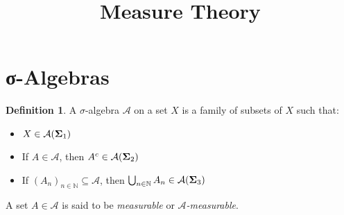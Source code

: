 \documentclass[12pt]{article}
\title{\textbf{Measure Theory}\\[0.5em]}
\author{}
\date{}
\theoremstyle{definition}
\newtheorem{definition}{Definition}[section]
\begin{document}
\maketitle

\section{σ-Algebras}

\medskip
\begin{definition}
A $\sigma$-algebra $\mathcal{A}$ on a set $X$ is a family of subsets of $X$ such that:
\begin{itemize}
    \item $X \in \mathcal{A} \hfill \text{($\boldsymbol{\Sigma}_1$)}$
    \item If $A \in \mathcal{A}$, then $A^c \in \mathcal{A} \hfill \text{($\boldsymbol{\Sigma}_2$)}$
    \item If $(A_n)_{n \in \mathbb{N}} \subseteq \mathcal{A}$, then $\bigcup_{n \in \mathbb{N}} A_n \in \mathcal{A} \hfill \text{($\boldsymbol{\Sigma}_3$)}$
\end{itemize}

\medskip

A set $A \in \mathcal{A}$ is said to be \textit{measurable} or \textit{$\mathcal{A}$-measurable}.
\end{definition}
\end{document}
